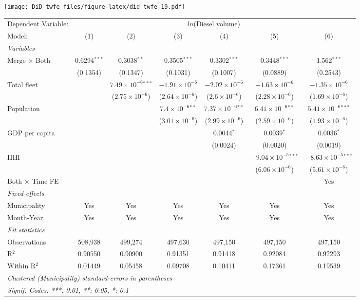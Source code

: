 \documentclass[
]{article}
\begin{document}
\texttt{[image: DiD\_twfe\_files/figure-latex/did\_twfe-19.pdf]}

\begin{tabular}{lcccccc}
\tabularnewline\midrule\midrule
Dependent Variable:&\multicolumn{6}{c}{$ln$(Diesel volume)}\\
Model:&(1) & (2) & (3) & (4) & (5) & (6)\\
\midrule \emph{Variables}&   &   &   &   &   &  \\
Merge $\times $ Both & 0.6294$^{***}$ & 0.3038$^{**}$ & 0.3505$^{***}$ & 0.3302$^{***}$ & 0.3448$^{***}$ & 1.562$^{***}$\\
  &(0.1354) & (0.1347) & (0.1031) & (0.1007) & (0.0889) & (0.2543)\\
Total fleet &    & $7.49\times 10^{-6}$$^{***}$ & $-1.91\times 10^{-6}$ & $-2.02\times 10^{-6}$ & $-1.63\times 10^{-6}$ & $-1.35\times 10^{-6}$\\
  &   & ($2.75\times 10^{-6}$) & ($2.64\times 10^{-6}$) & ($2.6\times 10^{-6}$) & ($2.28\times 10^{-6}$) & ($1.69\times 10^{-6}$)\\
Population &    &    & $7.4\times 10^{-6}$$^{**}$ & $7.37\times 10^{-6}$$^{**}$ & $6.41\times 10^{-6}$$^{**}$ & $5.41\times 10^{-6}$$^{***}$\\
  &   &    & ($3.01\times 10^{-6}$) & ($2.99\times 10^{-6}$) & ($2.59\times 10^{-6}$) & ($1.93\times 10^{-6}$)\\
GDP per capita &    &    &    & 0.0044$^{*}$ & 0.0039$^{*}$ & 0.0036$^{*}$\\
  &   &    &    & (0.0024) & (0.0020) & (0.0019)\\
HHI &    &    &    &    & $-9.04\times 10^{-5}$$^{***}$ & $-8.63\times 10^{-5}$$^{***}$\\
  &   &    &    &    & ($6.06\times 10^{-6}$) & ($5.61\times 10^{-6}$)\\
Both $\times$ Time FE &  &  &  &  &  & Yes\\
\midrule \emph{Fixed-effects}&   &   &   &   &   &  \\
Municipality & Yes & Yes & Yes & Yes & Yes & Yes\\
Month-Year & Yes & Yes & Yes & Yes & Yes & Yes\\
\midrule \emph{Fit statistics}&  & & & & & \\
Observations & 508,938&499,274&497,630&497,150&497,150&497,150\\
R$^2$ & 0.90550&0.90900&0.91351&0.91418&0.92084&0.92293\\
Within R$^2$ & 0.01449&0.05458&0.09708&0.10411&0.17361&0.19539\\
\midrule\midrule\multicolumn{7}{l}{\emph{Clustered (Municipality) standard-errors in parentheses}}\\
\multicolumn{7}{l}{\emph{Signif. Codes: ***: 0.01, **: 0.05, *: 0.1}}\\
\end{tabular}
\end{document}

